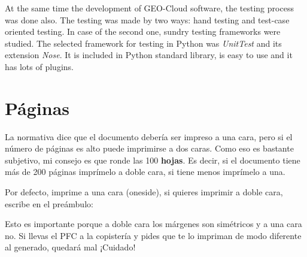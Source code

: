At the same time the development of GEO-Cloud software, the testing process was
done also. The testing was made by two ways: hand testing and test-case oriented
testing. In case of the second one, sundry testing frameworks were studied.
The selected framework for testing in Python was \emph{UnitTest} and its
extension \emph{Nose}. It is included in Python standard library, is easy to use
and it has lots of plugins.


\section{Páginas}
\label{sec:paginas}

La normativa dice que el documento debería ser impreso a una cara, pero si el
número de páginas es alto puede imprimirse a dos caras. Como eso es bastante
subjetivo, mi consejo es que ronde las 100 \textbf{hojas}. Es decir, si el
documento tiene más de 200 páginas imprímelo a doble cara, si tiene menos
imprímelo a una.

Por defecto, \arcopfc{} imprime a una cara (oneside), si quieres imprimir a doble cara,
escribe en el preámbulo:


Esto es importante porque a doble cara los márgenes son simétricos y a una cara
no. Si llevas el PFC a la copistería y pides que te lo impriman de modo
diferente al generado, quedará mal ¡Cuidado!
